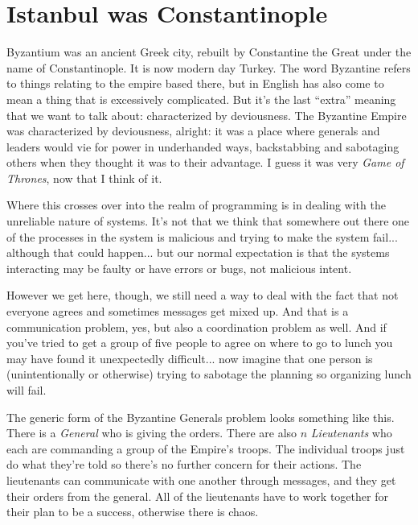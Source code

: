 




\section*{Istanbul was Constantinople}
Byzantium was an ancient Greek city, rebuilt by Constantine the Great under the name of Constantinople. It is now modern day Turkey. The word Byzantine refers to things relating to the empire based there, but in English has also come to mean a thing that is excessively complicated. But it's the last ``extra'' meaning that we want to talk about: characterized by deviousness. The Byzantine Empire was characterized by deviousness, alright: it was a place where generals and leaders would vie for power in underhanded ways, backstabbing and sabotaging others when they thought it was to their advantage. I guess it was very \textit{Game of Thrones}, now that I think of it.

Where this crosses over into the realm of programming is in dealing with the unreliable nature of systems. It's not that we think that somewhere out there one of the processes in the system is malicious and trying to make the system fail... although that could happen... but our normal expectation is that the systems interacting may be faulty or have errors or bugs, not malicious intent.

However we get here, though, we still need a way to deal with the fact that not everyone agrees and sometimes messages get mixed up. And that is a communication problem, yes, but also a coordination problem as well. And if you've tried to get a group of five people to agree on where to go to lunch you may have found it unexpectedly difficult... now imagine that one person is (unintentionally or otherwise) trying to sabotage the planning so organizing lunch will fail.

The generic form of the Byzantine Generals problem looks something like this. There is a \textit{General} who is giving the orders. There are also $n$ \textit{Lieutenants} who each are commanding a group of the Empire's troops. The individual troops just do what they're told so there's no further concern for their actions. The lieutenants can communicate with one another through messages, and they get their orders from the general. All of the lieutenants have to work together for their plan to be a success, otherwise there is chaos.

